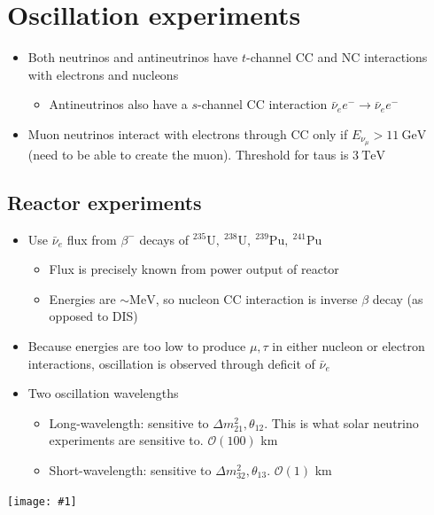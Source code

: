 \documentclass[11pt]{article}
\newcommand{\nubar}{{\bar{\nu}}}
\newcommand{\gev}{\text{GeV}}
\newcommand{\mev}{\text{MeV}}
\newcommand{\tev}{\text{TeV}}
\newcommand{\el}{\ensuremath{e^{-}}\xspace}
\newcommand{\ord}[1]{\ensuremath{\mathcal{O}(#1)}}
\newcommand{\embedimgw}[2]{\begin{center}\texttt{[image: \#1]}\end{center}}
\begin{document}
\section{Oscillation experiments}
\begin{itemize}
  \item Both neutrinos and antineutrinos have $t$-channel CC and NC interactions with electrons and nucleons
  \begin{itemize}
    \item Antineutrinos also have a $s$-channel CC interaction $\nubar_e \el \rightarrow \nubar_e \el$
  \end{itemize}
  \item Muon neutrinos interact with electrons through CC only if $E_{\nu_\mu}>11~\gev$ (need to be able to create the muon). Threshold for taus is $3~\tev$
\end{itemize}

\subsection{Reactor experiments}
\begin{itemize}
  \item Use $\nubar_e$ flux from $\beta^-$ decays of $^{235}\text{U},~^{238}\text{U},~^{239}\text{Pu},~^{241}\text{Pu}$
  \begin{itemize}
    \item Flux is precisely known from power output of reactor
    \item Energies are $\sim\mev$, so nucleon CC interaction is inverse $\beta$ decay (as opposed to DIS)
  \end{itemize}
  \item Because energies are too low to produce $\mu,\tau$ in either nucleon or electron interactions, oscillation is observed through deficit of $\nubar_e$
  \item Two oscillation wavelengths
  \begin{itemize}
    \item Long-wavelength: sensitive to $\Delta m_{21}^2,\theta_{12}$. This is what solar neutrino experiments are sensitive to. $\ord{100}$ km
    \item Short-wavelength: sensitive to $\Delta m_{32}^2,\theta_{13}$. $\ord1$ km
  \end{itemize}
\end{itemize}
\embedimgw{figs/nue_probability.png}{.5}
\end{document}
